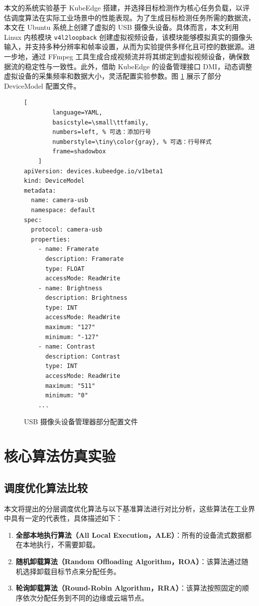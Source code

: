 本文的系统实验基于 KubeEdge 搭建，并选择目标检测作为核心任务负载，以评估调度算法在实际工业场景中的性能表现。为了生成目标检测任务所需的数据流，本文在 Ubuntu 系统上创建了虚拟的 USB 摄像头设备。具体而言，本文利用 Linux 内核模块 \texttt{v4l2loopback} 创建虚拟视频设备，该模块能够模拟真实的摄像头输入，并支持多种分辨率和帧率设置，从而为实验提供多样化且可控的数据源。进一步地，通过 FFmpeg 工具生成合成视频流并将其绑定到虚拟视频设备，确保数据流的稳定性与一致性。此外，借助 KubeEdge 的设备管理接口 DMI，动态调整虚拟设备的采集频率和数据大小，灵活配置实验参数。图 \ref{fig:dmi-config} 展示了部分 DeviceModel 配置文件。

\begin{figure}[ht]
    \centering
    \begin{lstlisting}[
        language=YAML,
        basicstyle=\small\ttfamily, 
        numbers=left, % 可选：添加行号
        numberstyle=\tiny\color{gray}, % 可选：行号样式
        frame=shadowbox
    ]
apiVersion: devices.kubeedge.io/v1beta1
kind: DeviceModel
metadata:
  name: camera-usb
  namespace: default
spec:
  protocol: camera-usb
  properties:
    - name: Framerate
      description: Framerate
      type: FLOAT
      accessMode: ReadWrite
    - name: Brightness
      description: Brightness
      type: INT
      accessMode: ReadWrite
      maximum: "127"
      minimum: "-127"
    - name: Contrast
      description: Contrast
      type: INT
      accessMode: ReadWrite
      maximum: "511"
      minimum: "0"
    ...
\end{lstlisting}
    \caption{USB 摄像头设备管理器部分配置文件}
    \label{fig:dmi-config}
\end{figure}

\section{核心算法仿真实验}

\subsection{调度优化算法比较}

本文将提出的分层调度优化算法与以下基准算法进行对比分析，这些算法在工业界中具有一定的代表性，具体描述如下：

\begin{enumerate}
    \item \textbf{全部本地执行算法（All Local Execution，ALE）}：所有的设备流式数据都在本地执行，不需要卸载。
    \item \textbf{随机卸载算法（Random Offloading Algorithm，ROA）}：该算法通过随机选择卸载目标节点来分配任务。
    \item \textbf{轮询卸载算法（Round-Robin Algorithm，RRA）}：该算法按照固定的顺序依次分配任务到不同的边缘或云端节点。
\end{enumerate}

